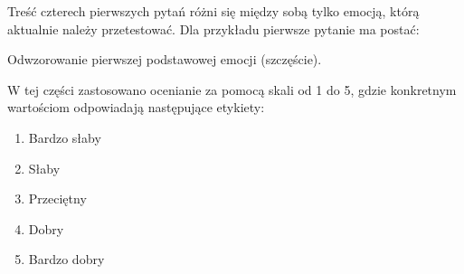 Treść czterech pierwszych pytań różni się między sobą tylko emocją, którą aktualnie należy przetestować. Dla przykładu pierwsze pytanie ma postać:
\begin{center}
    Odwzorowanie pierwszej podstawowej emocji (szczęście).
\end{center}

W tej części zastosowano ocenianie za pomocą skali od 1 do 5, gdzie konkretnym wartościom odpowiadają następujące etykiety:
\begin{enumerate}
    \item Bardzo słaby
    \item Słaby
    \item Przeciętny
    \item Dobry
    \item Bardzo dobry

\end{enumerate}

